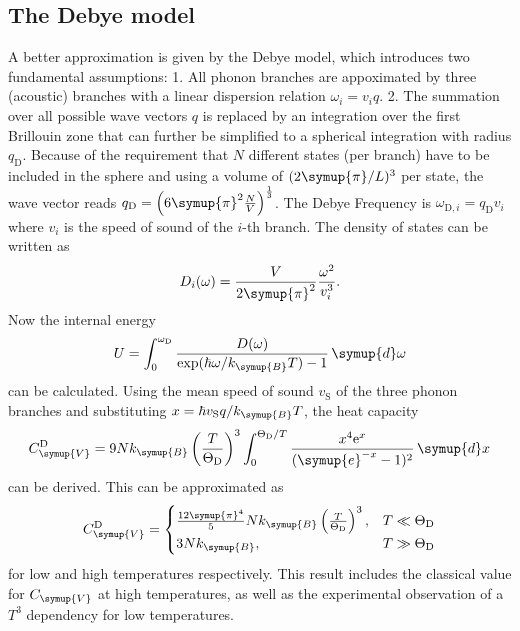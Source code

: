 \subsection{The Debye model}
A better approximation is given by the Debye model, which introduces two fundamental assumptions: 1. All phonon branches are appoximated by three (acoustic) branches with
a linear dispersion relation $\omega_i = v_i q$. 2. The summation over all possible wave vectors $q$ is replaced by an integration over the first Brillouin zone that can further
be simplified to a spherical integration with radius $q_\text{D}$. Because of the requirement that $N$ different states (per branch) have to be included in the sphere and using a
volume of $(2\symup{\pi}/L)^3$ per state, the wave vector reads $q_\text{D} = \left(6\symup{\pi}^2 \frac{N}{V}\right)^{\frac{1}{3}}$.
The Debye Frequency is $\omega_{\text{D}, i} = q_\text{D} v_i$ where $v_i$ is the speed of sound of the $i$-th branch.
The density of states can be written as
\begin{equation*}
    D_i(\omega) = \frac{V}{2\symup{\pi}^2}\frac{\omega^2}{v^3_i}.
\end{equation*}
Now the internal energy
\begin{equation*}
    U = \int^{\omega_\text{D}}_{0} \frac{D(\omega)}{\mathrm{exp}(\hbar\omega / k_{\symup{B}} T) -1} \,\symup{d}\omega
\end{equation*}
can be calculated.
Using the mean speed of sound $v_\text{S}$ of the three phonon branches and substituting $x = \hbar v_\text{S} q /k_{\symup{B}} T$, the heat capacity
\begin{equation}
    \label{eqn:CV_Debye}
    C^\text{D}_{\symup{V}} = 9N k_{\symup{B}} \left(\frac{T}{\Theta_\text{D}}\right)^3 \int^{\Theta_\text{D}/T}_{0} \frac{x^4 \mathrm{e}^x}{(\symup{e}^{-x} -1)^2} \, \symup{d}x
\end{equation}
can be derived.
This can be approximated as
\begin{equation*}
    C^\text{D}_{\symup{V}} =
    \begin{cases}
        \frac{12\symup{\pi}^4}{5}Nk_{\symup{B}} \left(\frac{T}{\Theta_\text{D}}\right)^3, & T \ll \Theta_\text{D}\\
        3Nk_{\symup{B}}, & T \gg \Theta_\text{D}\\
    \end{cases}
\end{equation*}
for low and high temperatures respectively. This result includes the classical value for $C_{\symup{V}}$ at high temperatures, as well as the experimental observation of
a $T^3$ dependency for low temperatures.
